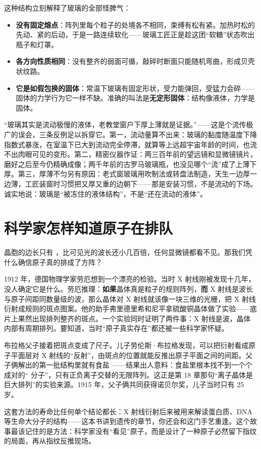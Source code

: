 这种结构立刻解释了玻璃的全部怪脾气：

\begin{itemize}[itemsep=2pt]
\item \textbf{没有固定熔点}：阵列里每个粒子的处境各不相同，束缚有松有紧。加热时松的先动、紧的后动，于是一路连续软化——玻璃工匠正是趁这团“软糖”状态吹出瓶子和灯罩。
\item \textbf{各方向性质相同}：没有整齐的弱面可循，敲碎时断面只能随机弯曲，形成贝壳状纹路。
\item \textbf{它是如假包换的固体}：常温下玻璃有固定形状，受力能弹回，受猛力会碎——固体的力学行为它一样不缺。准确的叫法是\textbf{无定形固体}：结构像液体，力学是固体。
\end{itemize}

\begin{wuqu}
“玻璃其实是流动极慢的液体，老教堂窗户下厚上薄就是证据。”——这是个流传极广的误会，三条反例足以拆穿它。第一，流动量算不出来：玻璃的黏度随温度下降指数式暴涨，在室温下已大到流动完全停滞，就算等上远超宇宙年龄的时间，也流不出肉眼可见的变形。第二，精密仪器作证：两三百年前的望远镜和显微镜镜片，磨好之后至今仍精确成像；两千年前的古罗马玻璃瓶，也没见哪个“流”成了上薄下厚。第三，厚薄不匀另有原因：老式窗玻璃用吹制法或转盘法制造，天生一边厚一边薄，工匠装窗时习惯把又厚又重的边朝下——那是安装习惯，不是流动的下场。诚实地说：玻璃是“被冻住的液体结构”，不是“还在流动的液体”。
\end{wuqu}

\section{科学家怎样知道原子在排队}

晶胞的边长只有 ，比可见光的波长还小几百倍，任何显微镜都看不见。那我们凭什么确信原子真的排成了方阵？

\begin{zhengju}
1912 年，德国物理学家劳厄想到一个漂亮的检验。当时 X 射线刚被发现十几年，没人确定它是什么。劳厄推理：\textbf{如果}晶体真是粒子的规则阵列，\textbf{而} X 射线是波长与原子间距同数量级的波，那么晶体对 X 射线就该像一块三维的光栅，把 X 射线衍射成规则的斑点图案。他的助手弗里德里希和尼平拿硫酸铜晶体做了实验——底片上果然出现排列整齐的斑点。一个实验同时证明了两件事：X 射线是波，晶体内部有周期排列。要知道，当时“原子真实存在”都还被一些科学家怀疑。

布拉格父子接着把斑点变成了尺子。儿子劳伦斯·布拉格发现，可以把衍射看成原子平面层对 X 射线的“反射”，由斑点的位置就能反推出原子平面之间的间距。父子俩解出的第一批结构里就有食盐 ——结果出人意料：食盐里根本找不到一个个成对的“ 分子”，只有正负离子交替的无限阵列。这正是第 18 章那句“离子晶体是巨大排列”的实验来源。1915 年，父子俩共同获得诺贝尔奖，儿子当时只有 25 岁。

这套方法的寿命比任何单个结论都长：X 射线衍射后来被用来解读蛋白质、DNA 等生命大分子的结构——这本书讲到遗传的章节，你还会和这门手艺重逢。这个故事最该记住的是方法：科学家没有“看见”原子，而是设计了一种原子必然留下指纹的局面，再从指纹反推现场。
\end{zhengju}

